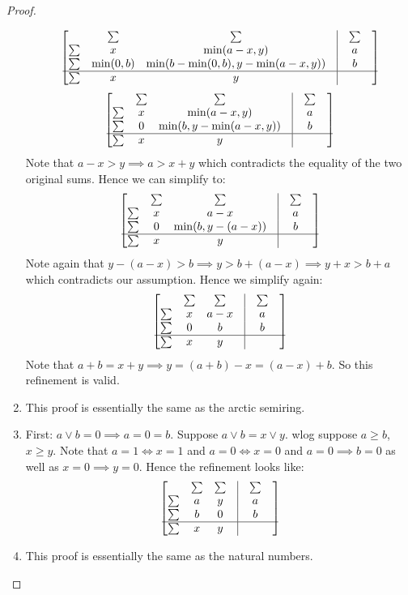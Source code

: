 \documentclass[a4paper,UKenglish,cleveref, autoref, thm-restate]{lipics-v2021}
\theoremstyle{plain}\newtheoremrep{thm}{Theorem}[section]
\begin{document}
\begin{toappendix}
\begin{proof}
\begin{enumerate}
$$\begin{bmatrix}
					&\sum & \sum &\vline & \sum \\
					\sum&x & \min(a-x,y)& \vline & a \\
					\sum&\min(0, b) & \min(b-\min(0, b), y-\min(a-x,y))& \vline & b \\
					\hline
					\sum&x & y & \vline& & 
				\end{bmatrix}
				$$
				$$
				\begin{bmatrix}
					&\sum & \sum &\vline & \sum \\
					\sum&x & \min(a-x,y)& \vline & a \\
					\sum&0 & \min(b, y-\min(a-x,y))& \vline & b \\
					\hline
					\sum&x & y & \vline& & 
				\end{bmatrix}
				$$
				Note that $a-x>y \implies a>x+y$ which contradicts the equality of the two original sums. Hence we can simplify to: 
				$$
				\begin{bmatrix}
					&\sum & \sum &\vline & \sum \\
					\sum&x & a-x& \vline & a \\
					\sum&0 & \min(b, y-(a-x))& \vline & b \\
					\hline
					\sum&x & y & \vline& & 
				\end{bmatrix}
				$$
				Note again that $y-(a-x) > b \implies y> b+(a-x) \implies y+x > b+a$ which contradicts our assumption. Hence we simplify again:
				$$
				\begin{bmatrix}
					&\sum & \sum &\vline & \sum \\
					\sum&x & a-x& \vline & a \\
					\sum&0 & b& \vline & b \\
					\hline
					\sum&x & y & \vline& & 
				\end{bmatrix}
				$$
				Note that $a+b=x+y \implies y = (a+b)-x = (a-x)+b$. So this refinement is valid.
				\item This proof is essentially the same as the arctic semiring.
				\item First: $a \lor b = 0 \implies a = 0 = b$. Suppose $a \lor b = x \lor y$. wlog suppose $a \geq b$, $x \geq y$. Note that $a = 1 \iff x=1$ and $a = 0 \iff x = 0$ and $a = 0 \implies b=0$ as well as $x=0 \implies y=0$. Hence the refinement looks like:
				$$
				\begin{bmatrix}
					&\sum & \sum &\vline & \sum \\
					\sum&a & y& \vline & a \\
					\sum&b & 0& \vline & b \\
					\hline
					\sum&x & y & \vline& & \rlap{\qedhere} 
				\end{bmatrix}
				$$
				\item This proof is essentially the same as the natural numbers.
			\end{enumerate}
		\end{proof}
		

\end{toappendix}
\end{document}
